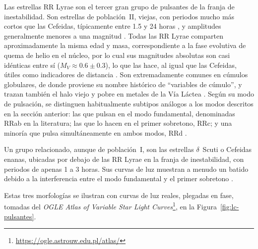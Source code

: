 \documentclass[12pt,letterpaper,oneside]{book}
\begin{document}
Las estrellas RR Lyrae son el tercer gran grupo de pulsantes de la franja de inestabilidad. Son estrellas de poblaci\'on~II, viejas, con periodos mucho m\'as cortos que las Cefeidas, t\'ipicamente entre 1.5 y 24 horas \citep{Carroll2017}, y amplitudes generalmente menores a una magnitud \citep{Karttunen2016}. Todas las RR Lyrae comparten aproximadamente la misma edad y masa, correspondiente a la fase evolutiva de quema de helio en el n\'ucleo, por lo cual sus magnitudes absolutas son casi id\'enticas entre s\'i ($M_V\approx0.6\pm0.3$), lo que las hace, al igual que las Cefeidas, \'utiles como indicadores de distancia \citep{Karttunen2016}. Son extremadamente comunes en c\'umulos globulares, de donde proviene su nombre hist\'orico de ``variables de c\'umulo'', y trazan tambi\'en el halo viejo y pobre en metales de la V\'ia L\'actea \citep{Karttunen2016}. Seg\'un su modo de pulsaci\'on, se distinguen habitualmente subtipos an\'alogos a los modos descritos en la secci\'on anterior: las que pulsan en el modo fundamental, denominadas RRab en la literatura; las que lo hacen en el primer sobretono, RRc; y una minor\'ia que pulsa simult\'aneamente en ambos modos, RRd \citep{Carroll2017}.

Un grupo relacionado, aunque de poblaci\'on~I, son las estrellas $\delta$~Scuti o Cefeidas enanas, ubicadas por debajo de las RR Lyrae en la franja de inestabilidad, con periodos de apenas 1 a 3 horas. Sus curvas de luz muestran a menudo un batido debido a la interferencia entre el modo fundamental y el primer sobretono \citep{Karttunen2016,Carroll2017}.

Estas tres morfolog\'ias se ilustran con curvas de luz reales, plegadas en fase, tomadas del \emph{OGLE Atlas of Variable Star Light Curves}\footnote{\url{https://ogle.astrouw.edu.pl/atlas/}}, en la Figura~\ref{fig:lc-pulsantes}.
\end{document}

